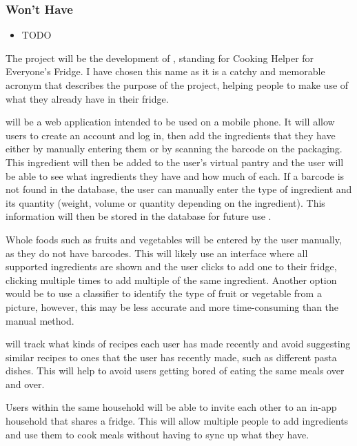 \documentclass[../CHEFCookingHelperForEveryonesFridge.tex]{subfiles}
\begin{document}
\subsubsection{Won't Have}
\begin{itemize}
    \item TODO
\end{itemize}

The project will be the development of \chef{}, standing for Cooking Helper for Everyone's Fridge. I have chosen this name
as it is a catchy and memorable acronym that describes the purpose of the project, helping people to make use of
what they already have in their fridge.

\chef{} will be a web application intended to be used on a mobile phone. It will allow users to create an account and log in,
then add the ingredients that they have either by manually entering them or by scanning the barcode on the packaging.
This ingredient will then be added to the user's virtual pantry and the user will be able to see what ingredients they have and how much of each.
If a barcode is not found in the database, the user can manually enter the type of ingredient and its quantity (weight, volume or quantity depending on the ingredient).
This information will then be stored in the database for future use .

Whole foods such as fruits and vegetables will be entered by the user manually, as they do not have barcodes. This will likely use an interface where
all supported ingredients are shown and the user clicks to add one to their fridge, clicking multiple times to add multiple of the same ingredient.
Another option would be to use a classifier to identify the type of fruit or vegetable from a picture, however, this may be less accurate and more
time-consuming than the manual method.

\chef{} will track what kinds of recipes each user has made recently and avoid suggesting similar recipes
to ones that the user has recently made, such as different pasta dishes. This will help to avoid users
getting bored of eating the same meals over and over.

Users within the same household will be able to invite each other to an in-app household that shares a fridge.
This will allow multiple people to add ingredients and use them to cook meals without having to sync up
what they have.
\end{document}
